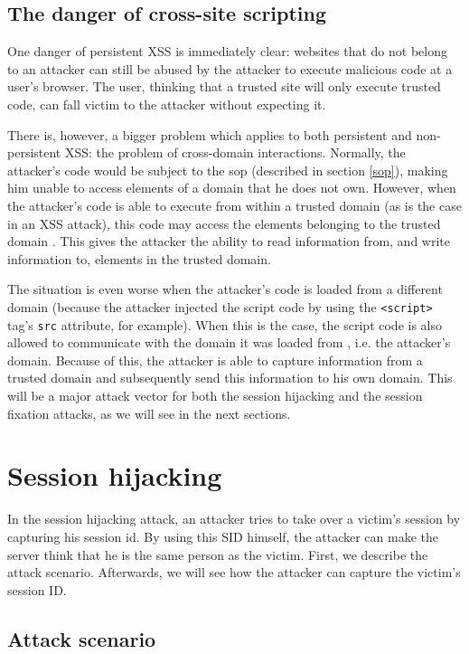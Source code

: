 \subsection{The danger of cross-site scripting}\label{xss-problem}

One danger of persistent XSS is immediately clear: websites that do not belong to an attacker can still be abused by the attacker to execute malicious code at a user's browser. The user, thinking that a trusted site will only execute trusted code, can fall victim to the attacker without expecting it.

There is, however, a bigger problem which applies to both persistent and non-persistent XSS: the problem of cross-domain interactions. Normally, the attacker's code would be subject to the \gls{sop} (described in section \ref{sop}), making him unable to access elements of a domain that he does not own. However, when the attacker's code is able to execute from within a trusted domain (as is the case in an XSS attack), this code may access the elements belonging to the trusted domain \cite{Klein2002}. This gives the attacker the ability to read information from, and write information to, elements in the trusted domain.

The situation is even worse when the attacker's code is loaded from a different domain (because the attacker injected the script code by using the \texttt{<script>} tag's \texttt{src} attribute, for example). When this is the case, the script code is also allowed to communicate with the domain it was loaded from \cite{Singh2010}, i.e. the attacker's domain. Because of this, the attacker is able to capture information from a trusted domain and subsequently send this information to his own domain. This will be a major attack vector for both the session hijacking and the session fixation attacks, as we will see in the next sections.

\section{Session hijacking}\label{hijacking}

In the session hijacking attack, an attacker tries to take over a victim's session by capturing his \gls{session id}. By using this SID himself, the attacker can make the server think that he is the same person as the victim. First, we describe the attack scenario. Afterwards, we will see how the attacker can capture the victim's session ID.

\subsection{Attack scenario}

